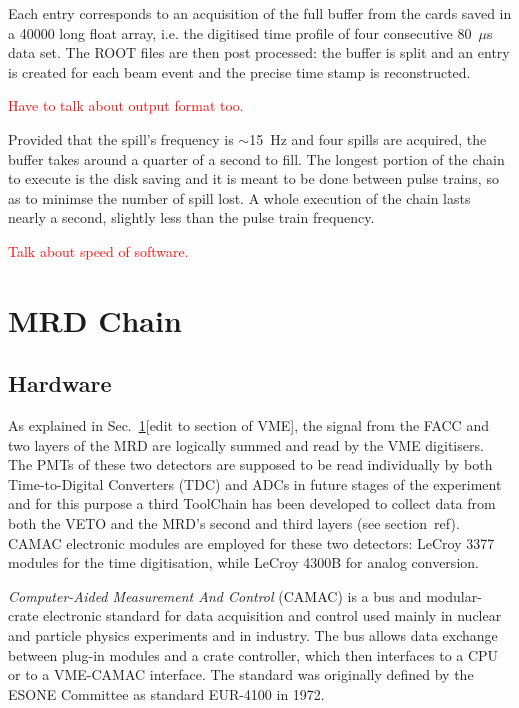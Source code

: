 Each entry corresponds to an acquisition of the full buffer from the cards saved in a 40000 long %
float array, i.e. the digitised time profile of four consecutive 80~$\mu$s data set.
The ROOT files are then post processed: the buffer is split and an entry is created for each %
beam event and the precise time stamp is reconstructed.

\textcolor{red}{Have to talk about output format too.}

Provided that the spill's frequency is $\sim$15~Hz and four spills are acquired, the buffer %
takes around a quarter of a second to fill.
The longest portion of the chain to execute is the disk saving and it is meant to be done %
between pulse trains, so as to minimse the number of spill lost.
A whole execution of the chain lasts nearly a second, slightly less than the pulse train frequency.

\textcolor{red}{Talk about speed of software.}



\section{MRD Chain}
\label{sec:3.2}

\subsection{Hardware}

As explained in Sec.~\ref{sec:3.2}[edit to section of VME], the signal from the FACC %
and two layers of the MRD are logically summed and read by the VME digitisers.
The PMTs of these two detectors are supposed to be read individually by both Time-to-Digital %
Converters (TDC) and ADCs in future stages of the experiment and for this purpose %
a third ToolChain has been developed to collect data from both the VETO and %
the MRD's second and third layers (see section~ref).
CAMAC electronic modules are employed for these two detectors: LeCroy 3377 modules for the time %
digitisation, while LeCroy 4300B for analog conversion.

\emph{Computer-Aided Measurement And Control} (CAMAC) is a bus and modular-crate electronic %
standard for data acquisition and control used mainly in nuclear and particle physics experiments %
and in industry.
The bus allows data exchange between plug-in modules and a crate controller, %
which then interfaces to a CPU or to a VME-CAMAC interface.
The standard was originally defined by the ESONE Committee as standard EUR-4100 in 1972.

